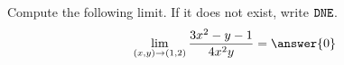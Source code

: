 \documentclass{ximera}
\author{Jim Talamo \and Bart Snapp}
\begin{document}
\begin{exercise}
  Compute the following limit. If it does not exist, write $\verb|DNE|$.
  \[
  \lim_{\point{x,y}\to \point{1,2}}\frac{3x^2-y-1}{4x^2y} = \answer{0}
  \]
\end{exercise}
\end{document}
